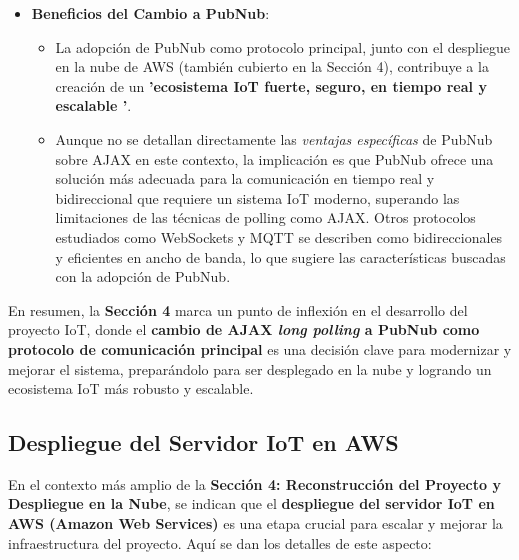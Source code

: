 \documentclass{report}
\begin{document}
\begin{itemize}
    \item \textbf{Beneficios del Cambio a PubNub}:
    \begin{itemize}
        \item La adopción de PubNub como protocolo principal, junto con el despliegue en la nube de AWS (también cubierto en la Sección 4), contribuye a 
        la creación de un \textbf{ 'ecosistema IoT fuerte, seguro, en tiempo real y escalable '}.
        \item Aunque no se  detallan directamente las \textit{ventajas específicas} de PubNub sobre AJAX en este contexto, la implicación es 
        que PubNub ofrece una solución más adecuada para la comunicación en tiempo real y bidireccional que requiere un sistema IoT moderno, superando 
        las limitaciones de las técnicas de polling como AJAX. Otros protocolos estudiados como WebSockets y MQTT se describen como bidireccionales y 
        eficientes en ancho de banda, lo que sugiere las características buscadas con la adopción de PubNub.
    \end{itemize}
\end{itemize}
En resumen, la \textbf{Sección 4} marca un punto de inflexión en el desarrollo del proyecto IoT, donde el \textbf{cambio de AJAX \textit{long polling} a 
PubNub como protocolo de comunicación principal} es una decisión clave para modernizar y mejorar el sistema, preparándolo para ser desplegado en la nube 
y logrando un ecosistema IoT más robusto y escalable.

\subsection{Despliegue del Servidor IoT en AWS}
En el contexto más amplio de la \textbf{Sección 4: Reconstrucción del Proyecto y Despliegue en la Nube}, se  indican que el 
\textbf{despliegue del servidor IoT en AWS (Amazon Web Services)} es una etapa crucial para escalar y mejorar la infraestructura del proyecto. 
Aquí se dan los detalles de este aspecto:
\end{document}
